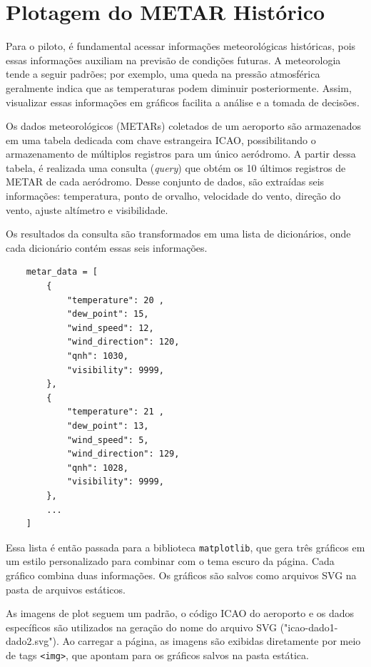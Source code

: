 \chapter{Plotagem do METAR Histórico}

Para o piloto, é fundamental acessar informações meteorológicas históricas, pois essas informações auxiliam 
na previsão de condições futuras. A meteorologia tende a seguir padrões; por exemplo, uma queda na pressão 
atmosférica geralmente indica que as temperaturas podem diminuir posteriormente. Assim, visualizar essas 
informações em gráficos facilita a análise e a tomada de decisões.

Os dados meteorológicos (METARs) coletados de um aeroporto são armazenados em uma tabela dedicada com chave
estrangeira ICAO, possibilitando
o armazenamento de múltiplos registros para um único aeródromo. A partir dessa tabela, é realizada uma consulta 
(\textit{query}) que obtém os 10 últimos registros de METAR de cada aeródromo. Desse conjunto de dados, são extraídas 
seis informações: temperatura, ponto de orvalho, velocidade do vento, direção do vento, ajuste altímetro e visibilidade.

Os resultados da consulta são transformados em uma lista de dicionários, onde cada dicionário contém essas seis 
informações.

\begin{verbatim}
    metar_data = [
        {
            "temperature": 20 ,
            "dew_point": 15,
            "wind_speed": 12,
            "wind_direction": 120,
            "qnh": 1030,
            "visibility": 9999,
        },
        {
            "temperature": 21 ,
            "dew_point": 13,
            "wind_speed": 5,
            "wind_direction": 129,
            "qnh": 1028,
            "visibility": 9999,
        },
        ...
    ]
\end{verbatim}


Essa lista é então passada para a biblioteca \texttt{matplotlib}, que gera três gráficos em um estilo 
personalizado para combinar com o tema escuro da página. Cada gráfico combina duas informações. 
Os gráficos são salvos como arquivos SVG na pasta de arquivos estáticos.

As imagens de plot seguem um padrão, o código ICAO do aeroporto e os dados específicos são utilizados na geração 
do nome do arquivo SVG ("icao-dado1-dado2.svg"). Ao carregar a página, as imagens 
são exibidas diretamente por meio de tags \texttt{<img>}, que apontam para os gráficos salvos na pasta estática.

